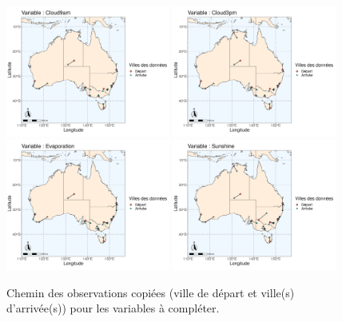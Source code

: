\documentclass{article}
\begin{document}
\begin{figure}[H]
    \centering
    \includegraphics[width=0.48\textwidth]{Images/Australia_map_segments_complete/Australia_map_segments_complete-1.jpg}
    \includegraphics[width=0.48\textwidth]{Images/Australia_map_segments_complete/Australia_map_segments_complete-2.jpg}
    \includegraphics[width=0.48\textwidth]{Images/Australia_map_segments_complete/Australia_map_segments_complete-3.jpg}
    \includegraphics[width=0.48\textwidth]{Images/Australia_map_segments_complete/Australia_map_segments_complete-4.jpg}
    \caption{Chemin des observations copiées (ville de départ et ville(s) d'arrivée(s)) pour les variables à compléter.}
\end{figure}
\end{document}
